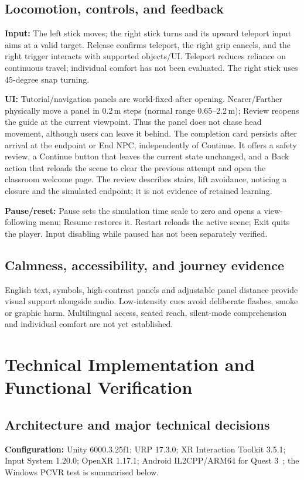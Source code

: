 \documentclass[12pt,a4paper]{article}
\begin{document}
\subsection{Locomotion, controls, and feedback}
\textbf{Input:} The left stick moves; the right stick turns and its upward
teleport input aims at a valid target. Release confirms teleport, the right
grip cancels, and the right trigger interacts with supported objects/UI.
Teleport reduces reliance on continuous travel; individual comfort has not
been evaluated. The right stick uses 45-degree snap turning.

\textbf{UI:} Tutorial/navigation panels are world-fixed after opening.
Nearer/Farther physically move a panel in 0.2\,m steps (normal range
0.65--2.2\,m); Review reopens the guide at the current viewpoint. Thus the
panel does not chase head movement, although users can leave it behind.
The completion card persists after arrival at the endpoint or End NPC,
independently of Continue. It offers a safety review, a Continue button that
leaves the current state unchanged, and a Back action that reloads the scene
to clear the previous attempt and open the classroom welcome page. The review
describes stairs, lift avoidance, noticing a closure and the simulated
endpoint; it is not evidence of retained learning.

\textbf{Pause/reset:} Pause sets the simulation time scale to zero and opens
a view-following menu; Resume restores it. Restart reloads the active scene;
Exit quits the player. Input disabling while paused has not been separately
verified.

\subsection{Calmness, accessibility, and journey evidence}
English text, symbols, high-contrast panels and adjustable panel distance
provide visual support alongside audio. Low-intensity cues avoid deliberate
flashes, smoke or graphic harm. Multilingual access, seated reach, silent-mode
comprehension and individual comfort are not yet established.

\newpage
\section{Technical Implementation and Functional Verification}
\subsection{Architecture and major technical decisions}
\textbf{Configuration:} Unity 6000.3.25f1; URP 17.3.0; XR Interaction Toolkit
3.5.1; Input System 1.20.0; OpenXR 1.17.1; Android IL2CPP/ARM64 for
Quest 3~\cite{implementation}; the Windows PCVR test is summarised below.
\end{document}
